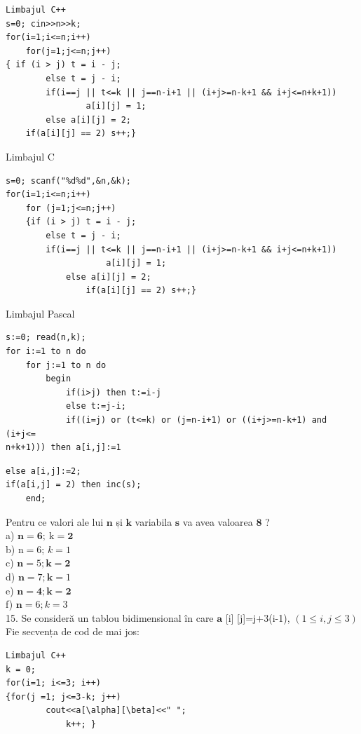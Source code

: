 \documentclass[10pt]{article}
\begin{document}
\begin{verbatim}
Limbajul C++
s=0; cin>>n>>k;
for(i=1;i<=n;i++)
    for(j=1;j<=n;j++)
{ if (i > j) t = i - j;
        else t = j - i;
        if(i==j || t<=k || j==n-i+1 || (i+j>=n-k+1 && i+j<=n+k+1))
                a[i][j] = 1;
        else a[i][j] = 2;
    if(a[i][j] == 2) s++;}
\end{verbatim}

Limbajul C

\begin{verbatim}
s=0; scanf("%d%d",&n,&k);
for(i=1;i<=n;i++)
    for (j=1;j<=n;j++)
    {if (i > j) t = i - j;
        else t = j - i;
        if(i==j || t<=k || j==n-i+1 || (i+j>=n-k+1 && i+j<=n+k+1))
                    a[i][j] = 1;
            else a[i][j] = 2;
                if(a[i][j] == 2) s++;}
\end{verbatim}

Limbajul Pascal

\begin{verbatim}
s:=0; read(n,k);
for i:=1 to n do
    for j:=1 to n do
        begin
            if(i>j) then t:=i-j
            else t:=j-i;
            if((i=j) or (t<=k) or (j=n-i+1) or ((i+j>=n-k+1) and (i+j<=
n+k+1))) then a[i,j]:=1
\end{verbatim}

\begin{verbatim}
else a[i,j]:=2;
if(a[i,j] = 2) then inc(s);
    end;
\end{verbatim}

Pentru ce valori ale lui $\mathbf{n}$ și $\mathbf{k}$ variabila $\mathbf{s}$ va avea valoarea $\mathbf{8}$ ?\\
a) $\mathbf{n}=\mathbf{6 ; ~} \mathrm{k}=\mathbf{2}$\\
b) $\mathrm{n}=6$; $k=1$\\
c) $\mathbf{n}=5 ; \mathbf{k}=\mathbf{2}$\\
d) $\mathbf{n}=7 ; \mathbf{k}=1$\\
e) $\mathbf{n}=\mathbf{4} ; \mathbf{k}=\mathbf{2}$\\
f) $\mathbf{n}=6 ; k=3$\\
15. Se consideră un tablou bidimensional în care $\mathbf{a}$ [i] [j]=j+3(i-1), $(1 \leq i, j \leq 3)$ Fie secvența de cod de mai jos:

\begin{verbatim}
Limbajul C++
k = 0;
for(i=1; i<=3; i++)
{for(j =1; j<=3-k; j++)
        cout<<a[\alpha][\beta]<<" ";
            k++; }
\end{verbatim}
\end{document}
